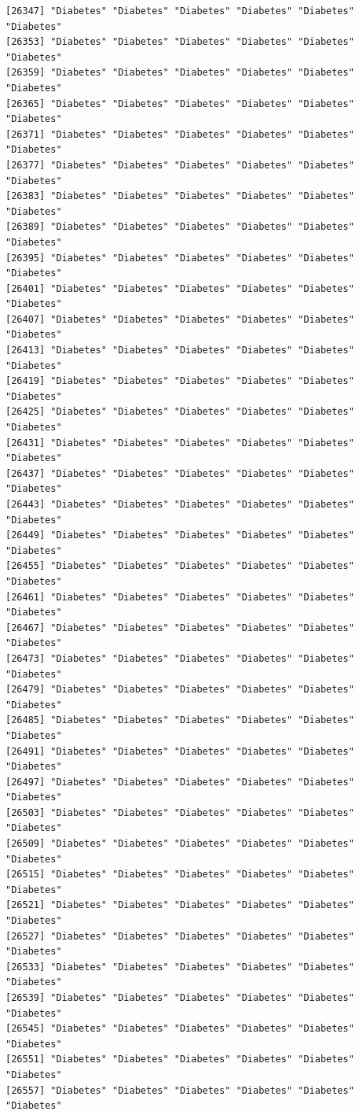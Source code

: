 \documentclass[
  letterpaper,
  DIV=11,
  numbers=noendperiod]{scrartcl}
\begin{document}
\begin{verbatim}
[26347] "Diabetes" "Diabetes" "Diabetes" "Diabetes" "Diabetes" "Diabetes"
[26353] "Diabetes" "Diabetes" "Diabetes" "Diabetes" "Diabetes" "Diabetes"
[26359] "Diabetes" "Diabetes" "Diabetes" "Diabetes" "Diabetes" "Diabetes"
[26365] "Diabetes" "Diabetes" "Diabetes" "Diabetes" "Diabetes" "Diabetes"
[26371] "Diabetes" "Diabetes" "Diabetes" "Diabetes" "Diabetes" "Diabetes"
[26377] "Diabetes" "Diabetes" "Diabetes" "Diabetes" "Diabetes" "Diabetes"
[26383] "Diabetes" "Diabetes" "Diabetes" "Diabetes" "Diabetes" "Diabetes"
[26389] "Diabetes" "Diabetes" "Diabetes" "Diabetes" "Diabetes" "Diabetes"
[26395] "Diabetes" "Diabetes" "Diabetes" "Diabetes" "Diabetes" "Diabetes"
[26401] "Diabetes" "Diabetes" "Diabetes" "Diabetes" "Diabetes" "Diabetes"
[26407] "Diabetes" "Diabetes" "Diabetes" "Diabetes" "Diabetes" "Diabetes"
[26413] "Diabetes" "Diabetes" "Diabetes" "Diabetes" "Diabetes" "Diabetes"
[26419] "Diabetes" "Diabetes" "Diabetes" "Diabetes" "Diabetes" "Diabetes"
[26425] "Diabetes" "Diabetes" "Diabetes" "Diabetes" "Diabetes" "Diabetes"
[26431] "Diabetes" "Diabetes" "Diabetes" "Diabetes" "Diabetes" "Diabetes"
[26437] "Diabetes" "Diabetes" "Diabetes" "Diabetes" "Diabetes" "Diabetes"
[26443] "Diabetes" "Diabetes" "Diabetes" "Diabetes" "Diabetes" "Diabetes"
[26449] "Diabetes" "Diabetes" "Diabetes" "Diabetes" "Diabetes" "Diabetes"
[26455] "Diabetes" "Diabetes" "Diabetes" "Diabetes" "Diabetes" "Diabetes"
[26461] "Diabetes" "Diabetes" "Diabetes" "Diabetes" "Diabetes" "Diabetes"
[26467] "Diabetes" "Diabetes" "Diabetes" "Diabetes" "Diabetes" "Diabetes"
[26473] "Diabetes" "Diabetes" "Diabetes" "Diabetes" "Diabetes" "Diabetes"
[26479] "Diabetes" "Diabetes" "Diabetes" "Diabetes" "Diabetes" "Diabetes"
[26485] "Diabetes" "Diabetes" "Diabetes" "Diabetes" "Diabetes" "Diabetes"
[26491] "Diabetes" "Diabetes" "Diabetes" "Diabetes" "Diabetes" "Diabetes"
[26497] "Diabetes" "Diabetes" "Diabetes" "Diabetes" "Diabetes" "Diabetes"
[26503] "Diabetes" "Diabetes" "Diabetes" "Diabetes" "Diabetes" "Diabetes"
[26509] "Diabetes" "Diabetes" "Diabetes" "Diabetes" "Diabetes" "Diabetes"
[26515] "Diabetes" "Diabetes" "Diabetes" "Diabetes" "Diabetes" "Diabetes"
[26521] "Diabetes" "Diabetes" "Diabetes" "Diabetes" "Diabetes" "Diabetes"
[26527] "Diabetes" "Diabetes" "Diabetes" "Diabetes" "Diabetes" "Diabetes"
[26533] "Diabetes" "Diabetes" "Diabetes" "Diabetes" "Diabetes" "Diabetes"
[26539] "Diabetes" "Diabetes" "Diabetes" "Diabetes" "Diabetes" "Diabetes"
[26545] "Diabetes" "Diabetes" "Diabetes" "Diabetes" "Diabetes" "Diabetes"
[26551] "Diabetes" "Diabetes" "Diabetes" "Diabetes" "Diabetes" "Diabetes"
[26557] "Diabetes" "Diabetes" "Diabetes" "Diabetes" "Diabetes" "Diabetes"

\end{verbatim}
\end{document}
